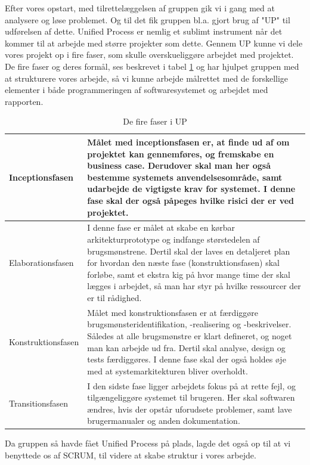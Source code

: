 Efter vores opstart, med tilrettelæggelsen af gruppen gik vi i gang med at analysere og løse problemet. Og til det fik gruppen bl.a. gjort brug af "UP" til udførelsen af dette. Unified Process er nemlig et sublimt instrument når det kommer til at arbejde med større projekter som dette. Gennem UP kunne vi dele vores projekt op i fire faser, som skulle overskueliggøre arbejdet med projektet. De fire faser og deres formål, ses beskrevet i tabel \ref{tab:UP_faser} og har hjulpet gruppen med at strukturere vores arbejde, så vi kunne arbejde målrettet med de forskellige elementer i både programmeringen af softwaresystemet og arbejdet med rapporten. 
        \begin{table}[H]
        \centering
        \begin{tabular}{|p{35mm}|p{105mm}|}
        \hline
            Inceptionsfasen & Målet med inceptionsfasen er, at finde ud af om projektet kan gennemføres, og fremskabe en business case. Derudover skal man her også bestemme systemets anvendelsesområde, samt udarbejde de vigtigste krav for systemet. I denne fase skal der også påpeges hvilke risici der er ved projektet.
        \\ \hline
            Elaborationsfasen & I denne fase er målet at skabe en kørbar arkitekturprototype og indfange størstedelen af brugsmønstrene. Dertil skal der laves en detaljeret plan for hvordan den næste fase (konstruktionsfasen) skal forløbe, samt et ekstra kig på hvor mange time der skal lægges i arbejdet, så man har styr på hvilke ressourcer der er til rådighed.
        \\ \hline
            Konstruktionsfasen & Målet med konstruktionsfasen er at færdiggøre brugsmønsteridentifikation, -realisering og -beskrivelser. Således at alle brugsmønstre er klart defineret, og noget man kan arbejde ud fra. Dertil skal analyse, design og tests færdiggøres. I denne fase skal der også holdes øje med at systemarkitekturen bliver overholdt.
        \\ \hline
            Transitionsfasen & I den sidste fase ligger arbejdets fokus på at rette fejl, og tilgængeliggøre systemet til brugeren. Her skal softwaren ændres, hvis der opstår uforudsete problemer, samt lave brugermanualer og anden dokumentation.
        \\ \hline
        \end{tabular}
            \caption{De fire faser i UP}
            \label{tab:UP_faser}
        \end{table}
Da gruppen så havde fået Unified Process på plads, lagde det også op til at vi benyttede os af SCRUM, til videre at skabe struktur i vores arbejde. %
